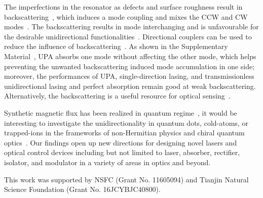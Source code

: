 \documentclass[prl,showpacs,superscriptaddress,twocolumn]{revtex4-1}
\begin{document}
The imperfections in the resonator as defects and surface roughness result
in backscattering~\cite{TJK,Borselli,Morichetti}, which induces a mode
coupling and mixes the CCW and CW modes~\cite{TJK}. The backscattering results in mode interchanging and is
unfavourable for the desirable unidirectional functionalities~\cite{LJinPRA2011}. Directional couplers can be used to reduce the influence of
backscattering~\cite{HafeziNatPhoton}. As shown in the Supplementary
Material~\cite{Supplementary}, UPA absorbs one mode without affecting the
other mode, which helps preventing the unwanted backscattering induced mode
accumulation in one side; moreover, the performances of UPA,
single-direction lasing, and transmissionless unidirectional lasing and
perfect absorption remain good at weak backscattering. Alternatively, the
backscattering is a useful resource for optical sensing~\cite%
{Wiersig,Wiersig2016,EP2Sensing}.

Synthetic magnetic flux has been realized in quantum regime~\cite%
{NP13,Goldman,PRA93}, it would be interesting to investigate the
unidirectionality in quantum dots, cold-atoms, or trapped-ions in the
frameworks of non-Hermitian physics and chiral quantum optics~\cite%
{TR,TRPRA,PL,PRA93,PZ}. Our findings open up new directions for designing
novel lasers and optical control devices including but not limited to laser,
absorber, rectifier, isolator, and modulator in a variety of areas in optics
and beyond.

\begin{acknowledgements}
This work was supported by NSFC (Grant No. 11605094) and Tianjin Natural
Science Foundation (Grant No. 16JCYBJC40800).
\end{acknowledgements}
\end{document}

